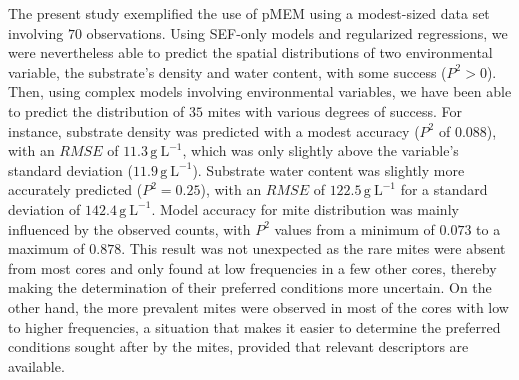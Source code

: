\documentclass[
]{article}
\begin{document}
The present study exemplified the use of pMEM using a modest-sized data
set involving \(70\) observations. Using SEF-only models and regularized
regressions, we were nevertheless able to predict the spatial
distributions of two environmental variable, the substrate's density and
water content, with some success (\(P^2>0\)). Then, using complex models
involving environmental variables, we have been able to predict the
distribution of \(35\) mites with various degrees of success. For
instance, substrate density was predicted with a modest accuracy
(\(P^2\) of \(0.088\)), with an \(RMSE\) of \(11.3\,\mathrm{g~L^{-1}}\),
which was only slightly above the variable's standard deviation
(\(11.9\,\mathrm{g~L^{-1}}\)). Substrate water content was slightly more
accurately predicted (\(P^2=0.25\)), with an \(RMSE\) of
\(122.5\,\mathrm{g~L^{-1}}\) for a standard deviation of
\(142.4\,\mathrm{g~L^{-1}}\). Model accuracy for mite distribution was
mainly influenced by the observed counts, with \(P^2\) values from a
minimum of \(0.073\) to a maximum of \(0.878\). This result was not
unexpected as the rare mites were absent from most cores and only found
at low frequencies in a few other cores, thereby making the
determination of their preferred conditions more uncertain. On the other
hand, the more prevalent mites were observed in most of the cores with
low to higher frequencies, a situation that makes it easier to determine
the preferred conditions sought after by the mites, provided that
relevant descriptors are available.
\end{document}
